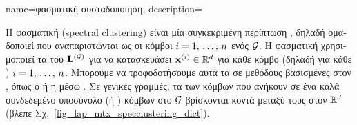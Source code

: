 {name={\foreignlanguage{greek}{φασματική συσταδοποίηση}},
	description={\foreignlanguage{greek}{Η φασματική}  
		(spectral clustering) \foreignlanguage{greek}{είναι μία συγκεκριμένη περίπτωση} , \foreignlanguage{greek}{δηλαδή 
		ομαδοποιεί}  \foreignlanguage{greek}{που αναπαριστώνται ως οι κόμβοι 
		$i=1, \,\ldots, \,n$ ενός}  $\mathcal{G}$. \foreignlanguage{greek}{Η φασματική} 
		 \foreignlanguage{greek}{χρησιμοποιεί τα}  
		\foreignlanguage{greek}{του}  ${\bf L}^{(\mathcal{G})}$ \foreignlanguage{greek}{για να κατασκευάσει} 
		 ${\bf x}^{(i)} \in \mathbb{R}^{d}$ 
		\foreignlanguage{greek}{για κάθε κόμβο (δηλαδή για κάθε} ) $i=1, \,\ldots, \,n$. 
		\foreignlanguage{greek}{Μπορούμε να τροφοδοτήσουμε αυτά τα}  \foreignlanguage{greek}{σε 
		μεθόδους}  \foreignlanguage{greek}{βασισμένες στον} ,
		\foreignlanguage{greek}{όπως ο}  \foreignlanguage{greek}{ή η}  
		\foreignlanguage{greek}{μέσω} . \foreignlanguage{greek}{Σε γενικές γραμμές, τα} 
		\foreignlanguage{greek}{των κόμβων που ανήκουν σε ένα καλά συνδεδεμένο υποσύνολο (ή} 
		) \foreignlanguage{greek}{κόμβων στο $\mathcal{G}$ βρίσκονται κοντά μεταξύ τους στον} 
		 $\mathbb{R}^{d}$ (\foreignlanguage{greek}{βλέπε Σχ.}\ \ref{fig_lap_mtx_specclustering_dict}). 
		\begin{figure}[H]
			\begin{center}
				\begin{minipage}{0.4\textwidth}
\end{minipage}
\end{center}
\end{figure}}}
